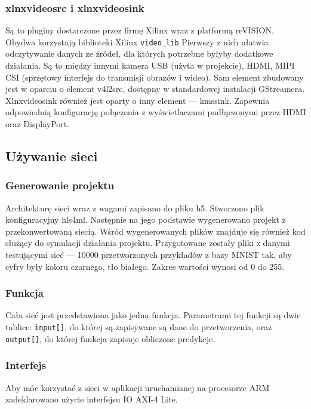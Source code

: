 \documentclass[12pt, oneside, a4paper]{article}
\begin{document}
\subsubsection{xlnxvideosrc i xlnxvideosink}
Są to pluginy dostarczone przez firmę Xilinx wraz z platformą reVISION.
Obydwa korzystają biblioteki Xilinx \lstinline{video_lib}
Pierwszy z nich ułatwia odczytywanie danych ze źródeł, dla których potrzebne
byłyby dodatkowe działania. Są to między innymi kamera USB (użyta w projekcie),
HDMI, MIPI CSI (sprzętowy interfejs do transmisji obrazów i wideo).
Sam element zbudowany jest w oparciu o element v4l2src, dostępny
w standardowej instalacji GStreamera.
Xlnxvideosink również jest oparty o inny element --- kmssink.
Zapewnia odpowiednią konfigurację połączenia z wyświetlaczami
podłączonymi przez HDMI oraz DisplayPort.


\subsection{Używanie sieci}
\subsubsection{Generowanie projektu}
Architekturę sieci wraz z wagami zapisano do pliku h5. Stworzono
plik konfiguracyjny hls4ml. Następnie na jego podstawie wygenerowano projekt
z przekonwertowaną siecią. Wśród wygenerowanych plików znajduje się
również kod służący do symulacji działania projektu. Przygotowane zostały
pliki z danymi testującymi sieć --- 10000 przetworzonych przykładów z bazy
MNIST tak, aby cyfry były koloru czarnego, tło białego. Zakres wartości
wynosi od 0 do 255.

\subsubsection{Funkcja}
Cała sieć jest przedstawiona jako jedna funkcja.
Parametrami tej funkcji są dwie tablice:
\lstinline[style=hls]{input[]}, do której są zapisywane są
dane do przetworzenia,
oraz \lstinline[style=hls]{output[]}, do której funkcja zapisuje
obliczone predykcje.

\begin{minipage}{\linewidth}

\end{minipage}

\subsubsection{Interfejs}
Aby móc korzystać z sieci w aplikacji uruchamianej na procesorze ARM
zadeklarowano użycie interfejsu IO \mbox{AXI-4} Lite.
\end{document}
